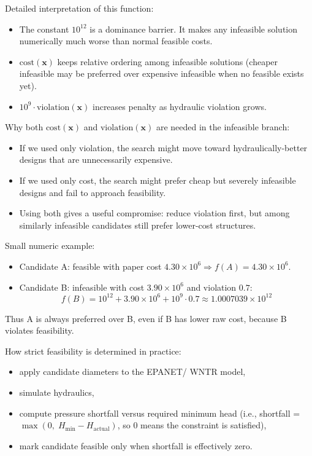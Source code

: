 \documentclass[12pt, a4paper]{article}
\begin{document}
Detailed interpretation of this function:
\begin{itemize}
	\item The constant $10^{12}$ is a dominance barrier. It makes any infeasible solution numerically much worse than normal feasible costs.
	\item $\text{cost}(\mathbf{x})$ keeps relative ordering among infeasible solutions (cheaper infeasible may be preferred over expensive infeasible when no feasible exists yet).
	\item $10^9\cdot\text{violation}(\mathbf{x})$ increases penalty as hydraulic violation grows.
\end{itemize}

Why both $\text{cost}(\mathbf{x})$ and $\text{violation}(\mathbf{x})$ are needed in the infeasible branch:
\begin{itemize}
	\item If we used only violation, the search might move toward hydraulically-better designs that are unnecessarily expensive.
	\item If we used only cost, the search might prefer cheap but severely infeasible designs and fail to approach feasibility.
	\item Using both gives a useful compromise: reduce violation first, but among similarly infeasible candidates still prefer lower-cost structures.
\end{itemize}

Small numeric example:
\begin{itemize}
	\item Candidate A: feasible with paper cost $4.30\times10^6 \Rightarrow f(A)=4.30\times10^6$.
	\item Candidate B: infeasible with cost $3.90\times10^6$ and violation $0.7$:
	      \[
		      f(B)=10^{12}+3.90\times10^6+10^9\cdot0.7 \approx 1.0007039\times10^{12}
	      \]
\end{itemize}
Thus A is always preferred over B, even if B has lower raw cost, because B violates feasibility.

How strict feasibility is determined in practice:
\begin{itemize}
	\item apply candidate diameters to the EPANET/ WNTR model,
	\item simulate hydraulics,
	\item compute pressure shortfall versus required minimum head (i.e., shortfall = $\max(0,\;H_{\min}-H_{\text{actual}})$, so 0 means the constraint is satisfied),
	\item mark candidate feasible only when shortfall is effectively zero.
\end{itemize}
\end{document}
